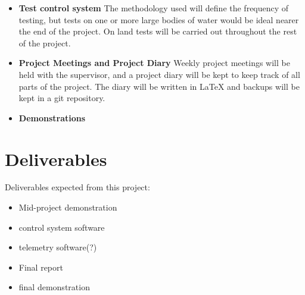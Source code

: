 \documentclass[titlepage 12pt]{article}
\begin{document}
{\begin{itemize}
\item \textbf{Test control system} The methodology used will define the frequency of testing, but tests on one or more large bodies of water would be ideal nearer the end of the project. On land tests will be carried out throughout the rest of the project.
\item \textbf{Project Meetings and Project Diary} Weekly project meetings will be held with the supervisor, and a project diary will be kept to keep track of all parts of the project. The diary will be written in LaTeX and backups will be kept in a git repository.
\item \textbf{Demonstrations}
\end{itemize}




\section{Deliverables}  
Deliverables expected from this project: 
\begin{itemize}
	\item Mid-project demonstration
	\item control system software
	\item telemetry software(?)
	\item Final report
	\item final demonstration
\end{itemize}


    
\newpage
\raggedright
{}
\printbibliography[title={Annotated Bibliography}]
%


}
\end{document}
